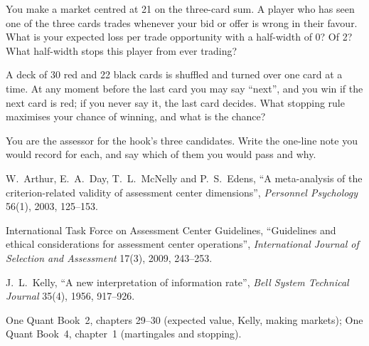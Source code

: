 \begin{interviewq}\label{iq:iv:the-final-round-and-trading-games:8}
You make a market centred at 21 on the three-card sum. A player who has seen one of the three cards trades
whenever your bid or offer is wrong in their favour. What is your expected loss per trade opportunity with a
half-width of 0? Of 2? What half-width stops this player from ever trading?
\end{interviewq}

\begin{interviewq}\label{iq:iv:the-final-round-and-trading-games:9}
A deck of 30 red and 22 black cards is shuffled and turned over one card at a time. At any moment before the
last card you may say ``next'', and you win if the next card is red; if you never say it, the last card
decides. What stopping rule maximises your chance of winning, and what is the chance?
\end{interviewq}

\begin{interviewq}\label{iq:iv:the-final-round-and-trading-games:10}
You are the assessor for the hook's three candidates. Write the one-line note you would record for each, and
say which of them you would pass and why.
\end{interviewq}

\begin{omsources}
\item W.~Arthur, E.~A.~Day, T.~L.~McNelly and P.~S.~Edens, ``A meta-analysis of the criterion-related validity
of assessment center dimensions'', \emph{Personnel Psychology} 56(1), 2003, 125--153.
\item International Task Force on Assessment Center Guidelines, ``Guidelines and ethical considerations for
assessment center operations'', \emph{International Journal of Selection and Assessment} 17(3), 2009,
243--253.
\item J.~L.~Kelly, ``A new interpretation of information rate'', \emph{Bell System Technical Journal} 35(4),
1956, 917--926.
\item One Quant Book~2, chapters 29--30 (expected value, Kelly, making markets); One Quant Book~4, chapter~1
(martingales and stopping).
\end{omsources}
